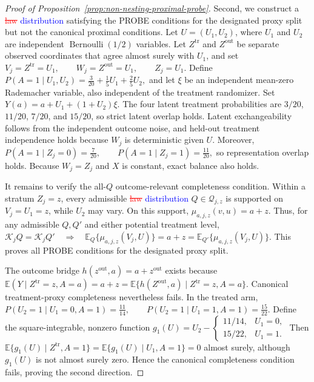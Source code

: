 \begin{proof}[Proof of Proposition~\ref{prop:non-nesting-proximal-probe}]
Second, we construct a \textcolor{red}{\sout{law}} \textcolor{blue}{distribution} satisfying the PROBE conditions for the designated proxy split but not the canonical proximal conditions. Let $U=(U_1,U_2)$, where $U_1$ and $U_2$ are independent $\operatorname{Bernoulli}(1/2)$ variables. Let $Z^{\mathrm{tr}}$ and $Z^{\mathrm{out}}$ be separate observed coordinates that agree almost surely with $U_1$, and set
\(V_j=Z^{\mathrm{tr}}=U_1, \qquad W_j=Z^{\mathrm{out}}=U_1, \qquad Z_j=U_1.\)
Define
\(P(A=1\mid U_1,U_2) = \frac3{20}+\frac15U_1+\frac25U_2,\)
and let $\xi$ be an independent mean-zero Rademacher variable, also independent of the treatment randomizer. Set
\(Y(a)=a+U_1+(1+U_2)\xi.\)
The four latent treatment probabilities are $3/20$, $11/20$, $7/20$, and $15/20$, so strict latent overlap holds. Latent exchangeability follows from the independent outcome noise, and held-out treatment independence holds because $W_j$ is deterministic given $U$. Moreover,
\(P(A=1\mid Z_j=0)=\frac7{20}, \qquad P(A=1\mid Z_j=1)=\frac{11}{20},\)
so representation overlap holds. Because $W_j=Z_j$ and $X$ is constant, exact balance also holds.

It remains to verify the all-$Q$ outcome-relevant completeness condition. Within a stratum $Z_j=z$, every admissible \textcolor{red}{\sout{law}} \textcolor{blue}{distribution} $Q\in\mathcal Q_{j,z}$ is supported on $V_j=U_1=z$, while $U_2$ may vary. On this support,
\(\mu_{a,j,z}(v,u)=a+z.\)
Thus, for any admissible $Q,Q'$ and either potential treatment level,
\(\mathcal K_jQ=\mathcal K_jQ' \quad\Longrightarrow\quad \mathbb E_Q\{\mu_{a,j,z}(V_j,U)\} =a+z =\mathbb E_{Q'}\{\mu_{a,j,z}(V_j,U)\}.\)
This proves all PROBE conditions for the designated proxy split.

The outcome bridge $h(z^{\mathrm{out}},a)=a+z^{\mathrm{out}}$ exists because
\(\mathbb E(Y\mid Z^{\mathrm{tr}}=z,A=a) =a+z =\mathbb E\{h(Z^{\mathrm{out}},a)\mid Z^{\mathrm{tr}}=z,A=a\}.\)
Canonical treatment-proxy completeness nevertheless fails. In the treated arm,
\(P(U_2=1\mid U_1=0,A=1)=\frac{11}{14}, \qquad P(U_2=1\mid U_1=1,A=1)=\frac{15}{22}.\)
Define the square-integrable, nonzero function
\(g_1(U) = U_2- \begin{cases} 11/14,&U_1=0,\\ 15/22,&U_1=1. \end{cases}\)
Then
\(\mathbb E\{g_1(U)\mid Z^{\mathrm{tr}},A=1\} = \mathbb E\{g_1(U)\mid U_1,A=1\} =0\)
almost surely, although $g_1(U)$ is not almost surely zero. Hence the canonical completeness condition fails, proving the second direction.


\end{proof}
